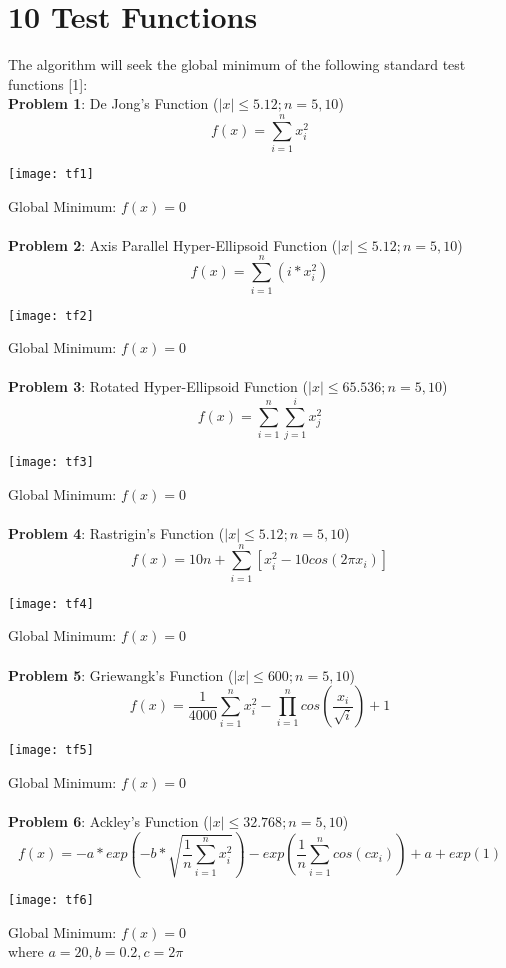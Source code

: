 \documentclass{article}
\begin{document}
\section{10 Test Functions}
The algorithm will seek the global minimum of the following standard test functions [1]:\\
\textbf{Problem 1}: De Jong's Function ($|x| \leq 5.12; n=5,10$)
\begin{equation}
f(x) = \sum^n_{i=1}x_i^2
\end{equation}
\centerline{\texttt{[image: tf1]}}
Global Minimum: $f(x) = 0$\\\\
\textbf{Problem 2}: Axis Parallel Hyper-Ellipsoid Function ($|x| \leq 5.12; n=5,10$)
\begin{equation}
f(x) = \sum^n_{i=1}(i*x_i^2)
\end{equation}
\centerline{\texttt{[image: tf2]}}
Global Minimum: $f(x) = 0$\\\\
\textbf{Problem 3}: Rotated Hyper-Ellipsoid Function ($|x| \leq 65.536; n=5,10$)
\begin{equation}
f(x) = \sum^n_{i=1}\sum^i_{j=1}x_j^2
\end{equation}
\centerline{\texttt{[image: tf3]}}
Global Minimum: $f(x) = 0$\\\\
\textbf{Problem 4}: Rastrigin's Function ($|x| \leq 5.12; n=5,10$)
\begin{equation}
f(x) = 10n + \sum^n_{i=1}[x_i^2 - 10cos(2\pi x_i)]
\end{equation}
\centerline{\texttt{[image: tf4]}}
Global Minimum: $f(x) = 0$\\\\
\textbf{Problem 5}: Griewangk's Function ($|x| \leq 600; n=5,10$)
\begin{equation}
f(x) = \frac{1}{4000}\sum^n_{i=1}x_i^2 - \prod^n_{i=1}cos(\frac{x_i}{\sqrt{i}}) + 1
\end{equation}
\centerline{\texttt{[image: tf5]}}
Global Minimum: $f(x) = 0$\\\\
\textbf{Problem 6}: Ackley's Function ($|x| \leq 32.768; n=5,10$)
\begin{equation}
f(x) = -a*exp(-b*\sqrt{\frac{1}{n}\sum^n_{i=1}x_i^2}) - exp(\frac{1}{n}\sum^n_{i=1}cos(cx_i)) + a + exp(1)
\end{equation}
\centerline{\texttt{[image: tf6]}}
Global Minimum: $f(x) = 0$\\
where $a=20, b=0.2, c = 2\pi$\\\\
\end{document}
